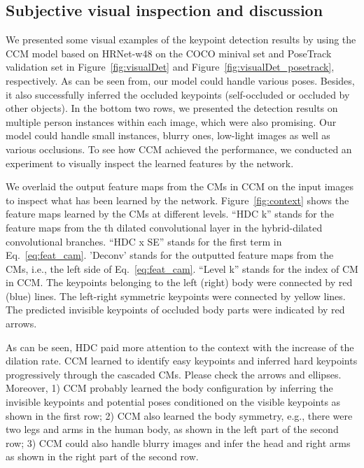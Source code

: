 \documentclass[twocolumn]{svjour3}          \smartqed  \usepackage{natbib}
\begin{document}
\subsection{Subjective visual inspection and discussion}
\label{subsec:subjective}
We presented some visual examples of the keypoint detection results by using the CCM model based on HRNet-w48 on the COCO minival set and PoseTrack validation set in Figure~\ref{fig:visualDet} and Figure~\ref{fig:visualDet_posetrack}, respectively. As can be seen from, our model could handle various poses. Besides, it also successfully inferred the occluded keypoints (self-occluded or occluded by other objects). In the bottom two rows, we presented the detection results on multiple person instances within each image, which were also promising. Our model could handle small instances, blurry ones, low-light images as well as various occlusions. To see how CCM achieved the performance, we conducted an experiment to visually inspect the learned features by the network. 

We overlaid the output feature maps from the CMs in CCM on the input images to inspect what has been learned by the network. Figure~\ref{fig:context} shows the feature maps learned by the CMs at different levels. ``HDC k'' stands for the feature maps from the th dilated convolutional layer in the hybrid-dilated convolutional branches. ``HDC x SE'' stands for the first term in Eq.~\eqref{eq:feat_cam}. 'Deconv' stands for the outputted feature maps from the CMs, i.e., the left side of Eq.~\eqref{eq:feat_cam}. ``Level k'' stands for the index of CM in CCM. The keypoints belonging to the left (right) body were connected by red (blue) lines. The left-right symmetric keypoints were connected by yellow lines. The predicted invisible keypoints of occluded body parts were indicated by red arrows.

As can be seen, HDC paid more attention to the context with the increase of the dilation rate. CCM learned to identify easy keypoints and inferred hard keypoints progressively through the cascaded CMs. Please check the arrows and ellipses. Moreover, 1) CCM probably learned the body configuration by inferring the invisible keypoints and potential poses conditioned on the visible keypoints as shown in the first row; 2) CCM also learned the body symmetry, e.g., there were two legs and arms in the human body, as shown in the left part of the second row; 3) CCM could also handle blurry images and infer the head and right arms as shown in the right part of the second row.
\end{document}
